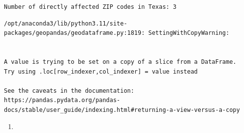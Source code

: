 \documentclass[
  letterpaper,
  DIV=11,
  numbers=noendperiod]{scrartcl}
\providecommand{\tightlist}{%
  \setlength{\itemsep}{0pt}\setlength{\parskip}{0pt}}\usepackage{longtable,booktabs,array}
\begin{document}
\begin{verbatim}
Number of directly affected ZIP codes in Texas: 3
\end{verbatim}

\begin{verbatim}
/opt/anaconda3/lib/python3.11/site-packages/geopandas/geodataframe.py:1819: SettingWithCopyWarning:


A value is trying to be set on a copy of a slice from a DataFrame.
Try using .loc[row_indexer,col_indexer] = value instead

See the caveats in the documentation: https://pandas.pydata.org/pandas-docs/stable/user_guide/indexing.html#returning-a-view-versus-a-copy
\end{verbatim}

\begin{enumerate}
\def\labelenumi{\arabic{enumi}.}
\setcounter{enumi}{2}
\tightlist
\item
\end{enumerate}
\end{document}
